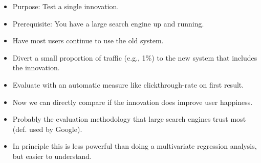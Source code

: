 \begin{breakbox}
\begin{itemize}
	\item Purpose: Test a single innovation.
	\item Prerequisite: You have a large search engine up and running.
	\item Have most users continue to use the old system.
	\item Divert a small proportion of traffic (e.g., 1\%) to the new system that includes the innovation.
	\item Evaluate with an automatic measure like clickthrough-rate on first result.
	\item Now we can directly compare if the innovation does improve user happiness.
	\item Probably the evaluation methodology that large search engines trust most (def. used by Google).
	\item In principle this is less powerful than doing a multivariate regression analysis, but easier to understand.
\end{itemize}
\end{breakbox}



















